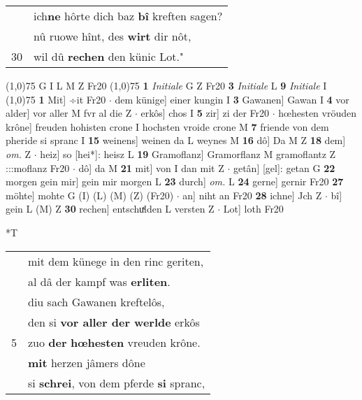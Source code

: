 \documentclass[8pt,a4paper,notitlepage]{article}
\begin{document}
\begin{table}[ht]
\begin{minipage}[t]{0.5\linewidth}
\begin{tabular}{rl}
 & ich\textbf{ne} hôrte dich baz \textbf{bî} kreften sagen?\\ 
 & nû ruowe hînt, des \textbf{wirt} dir nôt,\\ 
30 & wil dû \textbf{rechen} den künic Lot."\\ 
\end{tabular}
\scriptsize
\line(1,0){75} \newline
G I L M Z Fr20 \newline
\line(1,0){75} \newline
\textbf{1} \textit{Initiale} G Z Fr20  \textbf{3} \textit{Initiale} L  \textbf{9} \textit{Initiale} I  \newline
\line(1,0){75} \newline
\textbf{1} Mit] ÷it Fr20  $\cdot$ dem künige] einer kungin I \textbf{3} Gawanen] Gawan I \textbf{4} vor alder] vor aller M fvr al die Z  $\cdot$ erkôs] chos I \textbf{5} zir] zi der Fr20  $\cdot$ hœhesten vröuden krône] freuden hohisten crone I hochsten vroide crone M \textbf{7} friende von dem pheride si spranc I \textbf{15} weinens] weinen da L weynes M \textbf{16} dô] Da M Z \textbf{18} dem] \textit{om.} Z  $\cdot$ heiz] so [hei*]: heisz L \textbf{19} Gramoflanz] Gramorflanz M gramoflantz Z :::moflanz Fr20  $\cdot$ dô] da M \textbf{21} mit] von I dan mit Z  $\cdot$ getân] [gel]: getan G \textbf{22} morgen gein mir] gein mir morgen L \textbf{23} durch] \textit{om.} L \textbf{24} gerne] gernir Fr20 \textbf{27} möhte] mohte G (I) (L) (M) (Z) (Fr20)  $\cdot$ an] niht an Fr20 \textbf{28} ichne] Jch Z  $\cdot$ bî] gein L (M) Z \textbf{30} rechen] entschuͯlden L versten Z  $\cdot$ Lot] loth Fr20 \newline
\end{minipage}
\hspace{0.5cm}
\begin{minipage}[t]{0.5\linewidth}
\small
\begin{center}*T
\end{center}
\begin{tabular}{rl}
 & mit dem künege in den rinc geriten,\\ 
 & al dâ der kampf was \textbf{erliten}.\\ 
 & diu sach Gawanen kreftelôs,\\ 
 & den si \textbf{vor aller der werlde} erkôs\\ 
5 & zuo \textbf{der} \textbf{hœhesten} vreuden krône.\\ 
 & \textbf{mit} herzen jâmers dône\\ 
 & si \textbf{schrei}, von dem pferde \textbf{si} spranc,\\ 

\end{tabular}
\end{minipage}
\end{table}
\end{document}
